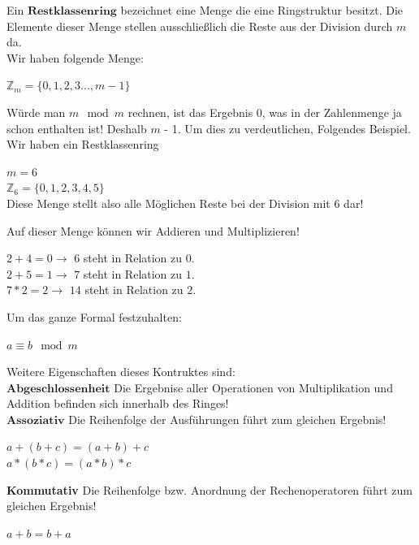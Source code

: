 \documentclass[a4paper,12pt]{scrartcl}
\begin{document}
 
 
 

Ein $\textbf {Restklassenring}$ bezeichnet eine Menge die eine Ringstruktur besitzt. Die Elemente dieser Menge stellen  ausschließlich die Reste aus der Division durch $m$ da. \\ Wir haben folgende Menge: 
\begin{center}
  $\mathbb{Z}_{m} = \{0 ,1,2,3.. ., m- 1 \}$ 

 \end{center}

 
 Würde man $m \mod m$ rechnen, ist das Ergebnis 0, was in der Zahlenmenge ja schon enthalten ist! Deshalb $m$ - 1. Um dies zu verdeutlichen, Folgendes Beispiel.
\\
Wir haben ein Restklassenring

\begin{center}
$m = 6$\\
 $\mathbb{Z}_{6} = \{0,1,2,3,4,5\}$\\
 Diese Menge stellt also alle Möglichen Reste bei der Division mit 6 dar!
\end{center}
Auf dieser Menge können wir Addieren und Multiplizieren! \\
\begin{center}
 $ 2 + 4 = 0 \rightarrow $ $6$ steht in Relation zu $0$.\\
 $2 + 5 = 1 \rightarrow $ $7$ steht in Relation zu $1.$\\
 $7 * 2 = 2 \rightarrow $ $14$ steht in Relation zu $2$.
\end{center}

Um das ganze Formal festzuhalten:
 \\
 \begin{center}
   $a \equiv b \mod m$

 \end{center}
 \newpage
 
 Weitere Eigenschaften dieses Kontruktes sind:\\
 $\textbf{Abgeschlossenheit}$   Die Ergebnise aller Operationen von Multiplikation und Addition befinden sich innerhalb des Ringes!
 \\
 

 

 $\textbf{Assoziativ}$ Die Reihenfolge der Ausführungen führt zum gleichen Ergebnis!
\begin{center}
 $a + (b+c) = (a + b) + c$\\
$a * (b *c) = (a * b) * c$

\end{center}
\textbf{Kommutativ}
Die Reihenfolge bzw. Anordnung der Rechenoperatoren führt zum gleichen Ergebnis! \\
\begin{center}
 $a + b = b + a $
\end{center}
\end{document}
